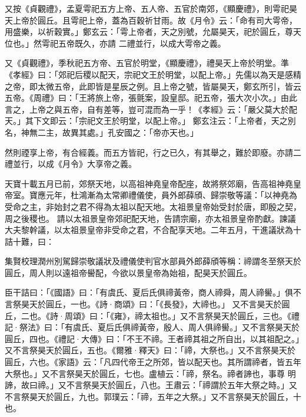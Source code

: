 \begin{pinyinscope}
 又按《貞觀禮》，孟夏雩祀五方上帝、五人帝、五官於南郊，《顯慶禮》，則雩祀昊天上帝於圓丘。且雩祀上帝，蓋為百穀祈甘雨。故《月令》云：「命有司大雩帝，用盛樂，以祈穀實。」鄭玄云：「雩上帝者，天之別號，允屬昊天，祀於圓丘，尊天位也。」然雩祀五帝既久，亦請
 二禮並行，以成大雩帝之義。



 又《貞觀禮》，季秋祀五方帝、五官於明堂，《顯慶禮》，禮昊天上帝於明堂。準《孝經》曰：「郊祀后稷以配天，宗祀文王於明堂，以配上帝。」先儒以為天是感精之帝，即太微五帝，此即皆是星辰之例。且上帝之號，皆屬昊天，鄭玄所引，皆云五帝。《周禮》曰：「王將旅上帝，張氈案，設皇邸。祀五帝，張大次小次。」由此言之，上帝之與五帝，自有差等，豈可混而為一乎！《孝經》云：「嚴父莫大於配天。」其下文即云：「宗祀文王於明堂，以配上帝。」
 鄭玄注云：「上帝者，天之別名，神無二主，故異其處。」孔安國之：「帝亦天也。」



 然則禋享上帝，有合經義。而五方皆祀，行之已久，有其舉之，難於即廢。亦請二禮並行，以成《月令》大享帝之義。



 天寶十載五月已前，郊祭天地，以高祖神堯皇帝配座，故將祭郊廟，告高祖神堯皇帝室。寶應元年，杜鴻漸為太常卿禮儀使，員外郎薛頎、歸崇敬等議：「以神堯為受命之主，非始封之君不得為太祖以配天地。太祖景皇帝始受封於唐，即殷之契，周之後稷也。
 請以太祖景皇帝郊祀配天地，告請宗廟，亦太祖景皇帝酌獻。諫議大夫黎幹議，以太祖景皇帝非受命之君，不合配享天地。二年五月，干進議狀為十詰十難，曰：



 集賢校理潤州別駕歸崇敬議狀及禮儀使判官水部員外郎薛頎等稱：禘謂冬至祭天於圓丘，周人則以遠祖帝嚳配，今欲以景皇帝為始祖，配昊天於圓丘。



 臣干詰曰：「《國語》曰：「有虞氏、夏后氏俱禘黃帝，商人禘舜，周人禘嚳。」俱不言祭昊天於圓丘，一也。《詩·商頌》曰：「《長發》，大禘也。」
 又不言昊天於圓丘，二也。《詩·周頌》曰：「《雍》，禘太祖也。」又不言祭昊天於圓丘，三也。《禮記·祭法》曰：「有虞氏、夏后氏俱禘黃帝，殷人、周人俱禘嚳。」又不言祭昊天於圓丘，四也。《禮記·大傳》曰：「不王不禘。王者禘其祖之所自出，以其祖配之。」又不言祭昊天於圓丘，五也。《爾雅·釋天》曰：「禘，大祭也。」又不言祭昊天於圓丘，六也。《家語》云：「凡四代帝王之所郊，皆以配天也。其所謂禘者，皆五年大祭也。」又不言祭昊天於圓丘，七也。盧植云：「禘，祭名。禘者諦也，事尊
 明諦，故曰禘。」又不言祭昊天於圓丘，八也。王肅云：「禘謂於五年大祭之時。」又不言祭昊天於圓丘，九也。郭璞云：「禘，五年之大祭。」又不言祭昊天於圓丘，十也。




\end{pinyinscope}

